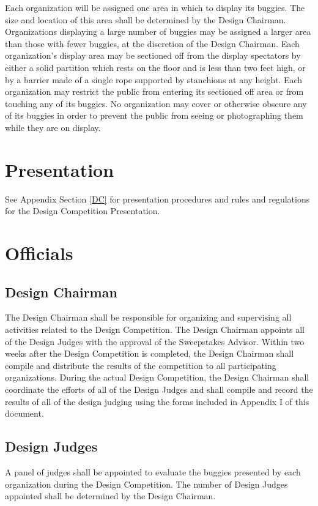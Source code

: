 	Each organization will be assigned one area in which to display its buggies. The size and location of this area shall be determined by the Design Chairman. Organizations displaying a large number of buggies may be assigned a larger area than those with fewer buggies, at the discretion of the Design Chairman. Each organization's display area may be sectioned off from the display spectators by either a solid partition which rests on the floor and is less than two feet high, or by a barrier made of a single rope supported by stanchions at any height. Each organization may restrict the public from entering its sectioned off area or from touching any of its buggies. No organization may cover or otherwise obscure any of its buggies in order to prevent the public from seeing or photographing them while they are on display. 

\section{Presentation}
See Appendix Section \ref{DC} for presentation procedures and rules and regulations for the Design Competition Presentation.

\section{Officials}

\subsection{Design Chairman}

	The Design Chairman shall be responsible for organizing and supervising all activities related to the Design Competition. The Design Chairman appoints all of the Design Judges with the approval of the Sweepstakes Advisor. Within two weeks after the Design Competition is completed, the Design Chairman shall compile and distribute the results of the competition to all participating organizations. During the actual Design Competition, the Design Chairman shall coordinate the efforts of all of the Design Judges and shall compile and record the results of all of the design judging using the forms included in Appendix I of this document.

\subsection{Design Judges}

	A panel of judges shall be appointed to evaluate the buggies presented by each organization during the Design Competition. The number of Design Judges appointed shall be determined by the Design Chairman.

